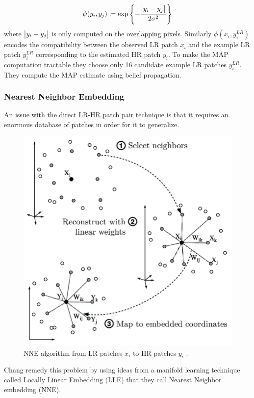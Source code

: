 \begin{equation}
    \psi(y_i, y_j) \coloneqq \exp \left\{ -  \frac{\abs{ y_i - y_j }}{2\sigma^2} \right\}
\end{equation}
where \(\abs{ y_i - y_j }\) is only computed on the overlapping pixels.
%
Similarly \(\phi(x_i, y_i^{LR})\) encodes the compatibility between the observed LR patch \(x_i\) and the example LR patch \(y_i^{LR}\) corresponding to the estimated HR patch \(y_i\).
%
To make the MAP computation tractable they choose only 16 candidate example LR patches \(y_i^{LR}\).
%
They compute the MAP estimate using belief propagation.

\subsubsection{Nearest Neighbor Embedding}
An issue with the direct LR-HR patch pair technique is that it requires an enormous database of patches in order for it to generalize.
%
\begin{figure}[!htbp]
    \centering
    \includegraphics[width=\linewidth,keepaspectratio]{figures/classical/lle.png}
    \caption{NNE algorithm from LR patches \(x_i\) to HR patches \(y_i\) \cite{Guillermophdthesis}.}
    \label{fig:lle}
\end{figure}
Chang \etal remedy this problem by using ideas from a manifold learning technique called Locally Linear Embedding \cite{saul2000introduction} (LLE) that they call Nearest Neighbor embedding (NNE).
